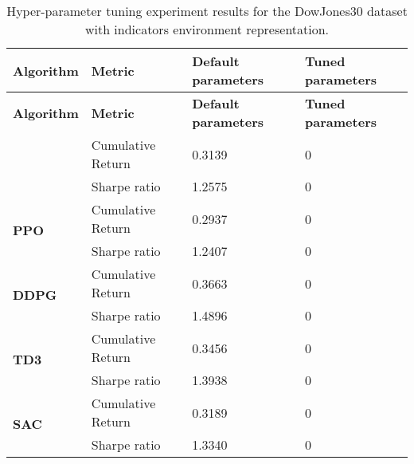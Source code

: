 \begin{longtable}{|l|l|l|l|}
    \hline
    \textbf{Algorithm} & \textbf{Metric} & \textbf{Default parameters} & \textbf{Tuned parameters} \\ \midrule
    \endfirsthead

    \hline
    \textbf{Algorithm} & \textbf{Metric} & \textbf{Default parameters} & \textbf{Tuned parameters} \\ \midrule
    \endhead

    \caption{Hyper-parameter tuning experiment results for the DowJones30 dataset with indicators environment representation.}
    \label{tab:experiment_hyperparameters_indicators}

    \endfoot

    \hline  
    \multirow{2}{*}{\textbf{A2C}}
    & Cumulative Return & 0.3139 & 0 \\ \cline{2-4}
    & Sharpe ratio & 1.2575 & 0 \\ \hline

    \multirow{2}{*}{\textbf{PPO}}
    & Cumulative Return & 0.2937 & 0 \\ \cline{2-4}
    & Sharpe ratio & 1.2407 & 0 \\ \hline

    \multirow{2}{*}{\textbf{DDPG}}
    & Cumulative Return & 0.3663 & 0 \\ \cline{2-4}
    & Sharpe ratio & 1.4896 & 0 \\ \hline

    \multirow{2}{*}{\textbf{TD3}}
    & Cumulative Return & 0.3456 & 0 \\ \cline{2-4}
    & Sharpe ratio & 1.3938 & 0 \\ \hline

    \multirow{2}{*}{\textbf{SAC}}
    & Cumulative Return & 0.3189 & 0 \\ \cline{2-4}
    & Sharpe ratio & 1.3340 & 0 \\ \hline
\end{longtable}